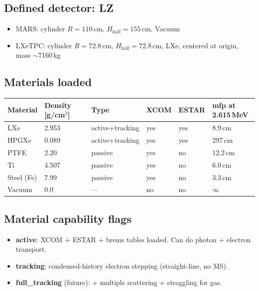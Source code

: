 \documentclass{article}
\begin{document}
\subsection{Defined detector: LZ}

\begin{itemize}
  \item MARS: cylinder $R = 110$\,cm, $H_{\mathrm{half}} = 155$\,cm, Vacuum
  \item LXeTPC: cylinder $R = 72.8$\,cm, $H_{\mathrm{half}} = 72.8$\,cm, LXe, centered at origin, mass $\sim$7160\,kg
\end{itemize}

\subsection{Materials loaded}

\begin{table}[h]
\centering
\begin{tabular}{@{}llllll@{}}
\toprule
Material & Density [g/cm$^3$] & Type & XCOM & ESTAR & mfp at 2.615\,MeV \\
\midrule
LXe        & 2.953 & active+tracking & yes & yes & 8.9\,cm \\
HPGXe      & 0.089 & active+tracking & yes & yes & 297\,cm \\
PTFE       & 2.20  & passive         & yes & no  & 12.2\,cm \\
Ti         & 4.507 & passive         & yes & no  & 6.0\,cm \\
Steel (Fe) & 7.99  & passive         & yes & no  & 3.3\,cm \\
Vacuum     & 0.0   & ---             & no  & no  & $\infty$ \\
\bottomrule
\end{tabular}
\end{table}

\subsection{Material capability flags}

\begin{itemize}
  \item \textbf{active}: XCOM + ESTAR + brems tables loaded. Can do photon + electron transport.
  \item \textbf{tracking}: condensed-history electron stepping (straight-line, no MS).
  \item \textbf{full\_tracking} (future): + multiple scattering + straggling for gas.
\end{itemize}
\end{document}
